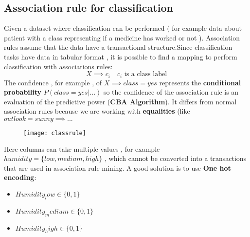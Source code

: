 \subsection{Association rule for classification}
Given a dataset where classification can be performed ( for example data about patient with a class representing if a medicine has worked or not ). Association rules assume that the data have a transactional structure.Since classification tasks have data in tabular format , it is possible to find a mapping to perform classification with associations rules:
$$ X \implies c_i \quad c_i \text{ is a class label}$$
The confidence , for example , of $ X \implies class=yes $ represents the \textbf{conditional probability} $P(class=yes|...)$ so the confidence of the association rule is an evaluation of the predictive power (\textbf{CBA Algorithm}). It differs from normal association rules because we are working with \textbf{equalities} (like $outlook=sunny \implies ...$
\begin{figure}[H]
  \centering
  \texttt{[image: classrule]}
\end{figure}
Here columns can take multiple values , for example $humidity = \{low,medium,high\}$ , which cannot be converted into a transactions that are used in association rule mining. A good solution is to use \textbf{One hot encoding}:
\begin{itemize}
\item $Humidity_low \in \{0,1\}$
\item $Humidity_medium \in \{0,1\}$
\item $Humidity_high \in \{0,1\}$

\end{itemize}